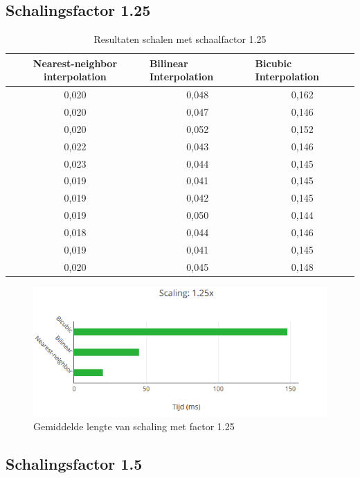 \documentclass{article}
\begin{document}
\subsection{Schalingsfactor 1.25}

\begin{table}[H]
    \centering
    \begin{tabular}{ccc}
        \toprule
            Nearest-neighbor interpolation & \multicolumn{1}{l}{Bilinear Interpolation} &\multicolumn{1}{l}{Bicubic Interpolation} \\
        \midrule
            0,020 & 0,048 & 0,162 \\
            0,020 & 0,047 & 0,146 \\
            0,020 & 0,052 & 0,152 \\
            0,022 & 0,043 & 0,146 \\
            0,023 & 0,044 & 0,145 \\
            0,019 & 0,041 & 0,145 \\
            0,019 & 0,042 & 0,145 \\
            0,019 & 0,050 & 0,144 \\
            0,018 & 0,044 & 0,146 \\
            0,019 & 0,041 & 0,145 \\
            0,020 & 0,045 & 0,148 \\
    \end{tabular}
    \caption{Resultaten schalen met schaalfactor 1.25}
\end{table}

\begin{figure}[H]
    \centering
    \includegraphics[width=12cm]{graphs/Scaling_125.PNG}
    \caption{Gemiddelde lengte van schaling met factor 1.25}
    \label{fig:my_label}
\end{figure}

\subsection{Schalingsfactor 1.5}
\end{document}
